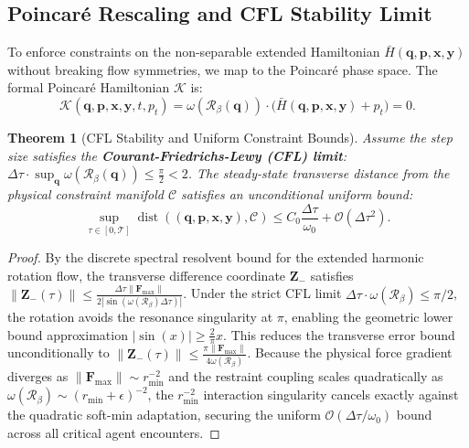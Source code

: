\documentclass[11pt,a4paper,reqno]{article}
\theoremstyle{plain}
\newtheorem{theorem}{Theorem}[section]
\theoremstyle{definition}
\theoremstyle{remark}
\numberwithin{equation}{section}
\begin{document}
\subsection{Poincaré Rescaling and CFL Stability Limit}
To enforce constraints on the non-separable extended Hamiltonian $\bar{H}(\bm{q}, \bm{p}, \bm{x}, \bm{y})$ without breaking flow symmetries, we map to the Poincaré phase space. The formal Poincaré Hamiltonian $\mathcal{K}$ is:
\begin{equation}
\mathcal{K}(\bm{q}, \bm{p}, \bm{x}, \bm{y}, t, p_t) = \omega(\mathcal{R}_\beta(\bm{q})) \cdot \Big( \bar{H}(\bm{q}, \bm{p}, \bm{x}, \bm{y}) + p_t \Big) = 0.
\end{equation}

\begin{theorem}[CFL Stability and Uniform Constraint Bounds]
\label{thm:adaptive_bound}
Assume the step size satisfies the \textbf{Courant-Friedrichs-Lewy (CFL) limit}: $\Delta \tau \cdot \sup_{\bm{q}} \omega(\mathcal{R}_\beta(\bm{q})) \le \frac{\pi}{2} < 2$. The steady-state transverse distance from the physical constraint manifold $\mathcal{C}$ satisfies an unconditional uniform bound:
\begin{equation}
\sup_{\tau \in [0, \mathcal{T}]} \operatorname{dist}((\bm{q}, \bm{p}, \bm{x}, \bm{y}), \mathcal{C}) \le C_0 \frac{\Delta \tau}{\omega_0} + \mathcal{O}(\Delta \tau^2).
\end{equation}
\end{theorem}
\begin{proof}
By the discrete spectral resolvent bound for the extended harmonic rotation flow, the transverse difference coordinate $\bm{Z}_-$ satisfies $\|\bm{Z}_-(\tau)\| \le \frac{\Delta \tau \|\bm{F}_{\max}\|}{2 |\sin(\omega(\mathcal{R}_\beta) \Delta \tau)|}$. Under the strict CFL limit $\Delta \tau \cdot \omega(\mathcal{R}_\beta) \le \pi/2$, the rotation avoids the resonance singularity at $\pi$, enabling the geometric lower bound approximation $|\sin(x)| \ge \frac{2}{\pi}x$. This reduces the transverse error bound unconditionally to $\|\bm{Z}_-(\tau)\| \le \frac{\pi \|\bm{F}_{\max}\|}{4 \omega(\mathcal{R}_\beta)}$. Because the physical force gradient diverges as $\|\bm{F}_{\max}\| \sim r_{\min}^{-2}$ and the restraint coupling scales quadratically as $\omega(\mathcal{R}_\beta) \sim (r_{\min} + \epsilon)^{-2}$, the $r_{\min}^{-2}$ interaction singularity cancels exactly against the quadratic soft-min adaptation, securing the uniform $\mathcal{O}(\Delta \tau / \omega_0)$ bound across all critical agent encounters.
\end{proof}
\end{document}
